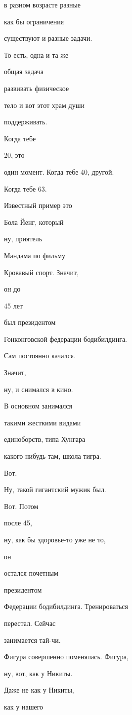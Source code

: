 в разном возрасте разные

как бы ограничения

существуют и разные задачи.

То есть, одна и та же

общая задача

развивать физическое

тело и вот этот храм души

поддерживать.

Когда тебе

20, это

один момент. Когда тебе 40, другой.

Когда тебе 63.

Известный пример это

Бола Йенг, который

ну, приятель

Мандама по фильму

Кровавый спорт. Значит,

он до

45 лет

был президентом

Гонконговской федерации бодибилдинга.

Сам постоянно качался.

Значит,

ну, и снимался в кино.

В основном занимался

такими жесткими видами

единоборств, типа Хунгара

какого-нибудь там, школа тигра.

Вот.

Ну, такой гигантский мужик был.

Вот. Потом

после 45,

ну, как бы здоровье-то уже не то,

он

остался почетным

президентом

Федерации бодибилдинга. Тренироваться

перестал. Сейчас

занимается тай-чи.

Фигура совершенно поменялась. Фигура,

ну, вот, как у Никиты.

Даже не как у Никиты,

как у нашего

